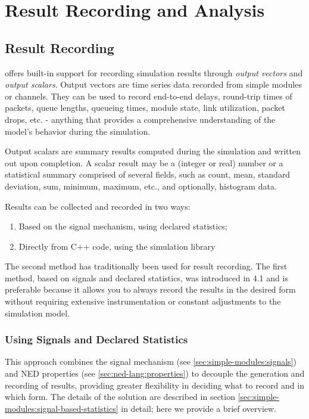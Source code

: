 \chapter{Result Recording and Analysis}
\label{cha:result-recording}

\section{Result Recording}
\label{sec:ana-sim:result-recording}

{\opp} offers built-in support for recording simulation results through
\textit{output vectors} and \textit{output scalars}. Output vectors are
time series data recorded from simple modules or channels. They can be used
to record end-to-end delays, round-trip times of packets, queue lengths,
queueing times, module state, link utilization, packet drops, etc. - anything
that provides a comprehensive understanding of the model's behavior during
the simulation.

Output scalars are summary results computed during the simulation and
written out upon completion. A scalar result may be a (integer or real)
number or a statistical summary comprised of several fields, such as count,
mean, standard deviation, sum, minimum, maximum, etc., and optionally,
histogram data.

Results can be collected and recorded in two ways:

\begin{enumerate}
  \item Based on the signal mechanism, using declared statistics;
  \item Directly from C++ code, using the simulation library
\end{enumerate}

The second method has traditionally been used for result recording. The
first method, based on signals and declared statistics, was introduced in
{\opp} 4.1 and is preferable because it allows you to always record the
results in the desired form without requiring extensive instrumentation or
constant adjustments to the simulation model.

\subsection{Using Signals and Declared Statistics}
\label{sec:ana-sim:signals-and-statistics}

This approach combines the signal mechanism (see
\ref{sec:simple-modules:signals}) and NED properties (see
\ref{sec:ned-lang:properties}) to decouple the generation and recording of
results, providing greater flexibility in deciding what to record and in
which form. The details of the solution are described in section
\ref{sec:simple-modules:signal-based-statistics} in detail; here we provide
a brief overview.

